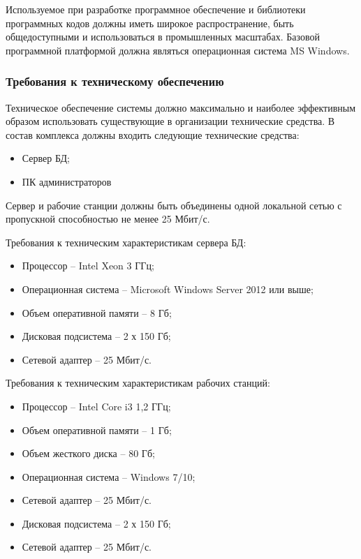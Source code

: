 \documentclass[russian, utf8, 12pt,pointsubsection,floatsubsection]{eskdtext}
\begin{document}
Используемое при разработке программное обеспечение и библиотеки программных кодов должны иметь широкое распространение, быть общедоступными и использоваться в промышленных масштабах. Базовой программной платформой должна являться операционная система MS Windows.


\subsubsection{Требования к техническому обеспечению}
Техническое обеспечение системы должно максимально и наиболее эффективным образом использовать существующие в организации технические средства. В состав комплекса должны входить следующие технические средства:
\begin{itemize}
    \item Сервер БД;
    \item ПК администраторов
\end{itemize}

Сервер и рабочие станции должны быть объединены одной локальной сетью с пропускной способностью не менее 25 Мбит/с.

Требования к техническим характеристикам сервера БД:
\begin{itemize}
    \item Процессор – Intel Xeon 3 ГГц;

\item Операционная система – Microsoft Windows Server 2012 или выше;

\item Объем оперативной памяти – 8 Гб;

\item Дисковая подсистема – 2 х 150 Гб;

\item Сетевой адаптер – 25 Мбит/с.
\end{itemize}

Требования к техническим характеристикам рабочих станций:
\begin{itemize}
    \item Процессор – Intel Core i3 1,2 ГГц;

\item Объем оперативной памяти – 1 Гб;

\item Объем жесткого диска – 80 Гб;

\item Операционная система – Windows 7/10;

\item Сетевой адаптер – 25 Мбит/с.

\item Дисковая подсистема – 2 х 150 Гб;

\item Сетевой адаптер – 25 Мбит/с.
\end{itemize}
\end{document}

